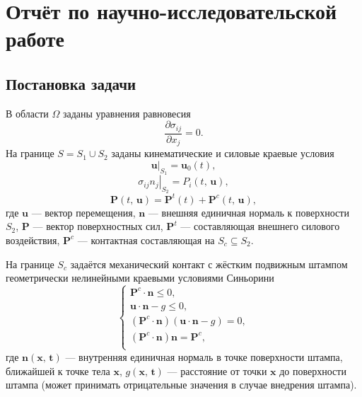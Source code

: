\chapter{Отчёт по научно-исследовательской работе}
\label{cha:analysis}
\section{Постановка задачи}
В области $\Omega$ заданы уравнения равновесия \cite{Pisarenko1981}
\begin{equation}
\frac{\partial\sigma_{ij}}{\partial x_j} = 0.%
\label{F:F1}
\end{equation}
На границе $S=S_{1}\cup S_{2}$ заданы кинематические и силовые
краевые условия
\begin{equation}
\left.\mathbf{u}\right|_{S_{1}}=\mathbf{u}_{0}\left(t\right),
\label{F:F2}
\end{equation}
\begin{equation}
\left.\sigma_{ij}n_j\right|_{S_{2}}=P_{i}\left(t,\,\mathbf{u}\right),%
\label{F:F3}
\end{equation}
\begin{equation}
\mathbf{P}\left(t,\,\mathbf{u}\right)=\mathbf{P}^t\left(t\right)+\mathbf{P}^c\left(t,\,\mathbf{u}\right),
\label{F:F_Contact_razlojenie}
\end{equation}
где $\mathbf{u}$ --- вектор перемещения, $\mathbf{n}$ --- внешняя единичная нормаль к поверхности $S_{2}$, $\mathbf{P}$ --- вектор поверхностных сил, $\mathbf{P}^t$ --- составляющая внешнего силового воздействия, $\mathbf{P}^c$ --- контактная составляющая на $S_c\subseteq S_2$.

На границе $S_{c}$ задаётся механический контакт с жёстким подвижным штампом геометрически нелинейными краевыми условиями Синьорини \cite{Kravchuk1994} 
\begin{equation}
\begin{cases}
\mathbf{P}^c\cdot\mathbf{n}\leq 0, \\
\mathbf{u}\cdot\mathbf{n}-g\leq 0, \\
\left(\mathbf{P}^c\cdot\mathbf{n}\right) \left(\mathbf{u}\cdot\mathbf{n}-g\right)=0, \\
\left( \mathbf{P}^c\cdot\mathbf{n}\right)\mathbf{n}=\mathbf{P}^c, \\
\end{cases}
\label{F:F_Contact_Signorini}
\end{equation}
где $\mathbf{n}\left(\mathbf{x},\,\mathbf{t}\right)$ --- внутренняя единичная нормаль в точке поверхности штампа, ближайшей к точке тела $\mathbf{x}$, $g\left(\mathbf{x},\,\mathbf{t}\right) $ --- расстояние от точки $\mathbf{x}$ до поверхности штампа (может принимать отрицательные значения в случае внедрения штампа).


